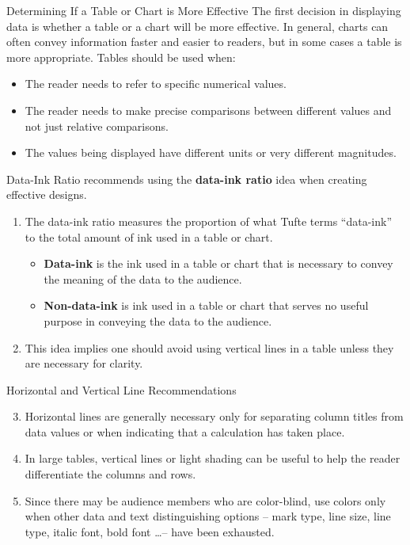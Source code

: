\documentclass[pdf]{beamer}
\newcommand{\empr}[1]{{\color{franklinblue}\textbf{#1}}}
\theoremstyle{remark}
\theoremstyle{definition}
\begin{document}
\begin{frame}[t]{Determining If a Table or Chart is More Effective}
The first decision in displaying data is whether a table or a chart will be more effective. In general, charts can often convey information faster and easier to readers, but in some cases
a table is more appropriate. Tables should be used when:  \\
\vspace{1.5ex}
\begin{itemize}
\item The reader needs to refer to specific numerical values.
\item The reader needs to make precise comparisons between different values and not just
relative comparisons.
\item The values being displayed have different units or very different magnitudes.
\end{itemize}
\end{frame}

\begin{frame}[t]{Data-Ink Ratio}
\cite{tufte2001} recommends using the \empr{data-ink ratio} idea when creating effective designs.
\vspace{0.0ex}
\begin{enumerate}
\item The data-ink ratio measures the proportion of what Tufte terms ``data-ink'' to the total amount of ink used in a table or chart. 
\begin{itemize}
\item \empr{Data-ink} is the ink used in a table or chart that is necessary to convey the meaning of the data to the audience. 
\item \empr{Non-data-ink} is ink used in a table or chart that serves no useful purpose in conveying the data to the audience.
\end{itemize} 
\item This idea implies one should avoid using vertical lines in a table unless they are necessary for clarity.
\end{enumerate}
\end{frame}

\begin{frame}[t]{Horizontal and Vertical Line Recommendations}
\begin{enumerate}
  \setcounter{enumi}{2}
\item Horizontal lines are generally necessary only for separating column titles from data values or when indicating that a calculation has taken place.
\item In large tables, vertical lines or light shading can be useful to help the reader differentiate the columns and rows.
\item Since there may be audience members who are color-blind, use colors only when other data and text distinguishing options -- mark type, line size, line type, italic font, bold font \ldots -- have been exhausted.
\end{enumerate}
\end{frame}
\end{document}
